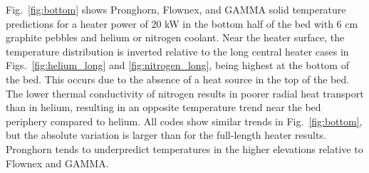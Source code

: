 Fig.\ \ref{fig:bottom} shows Pronghorn, Flownex, and GAMMA solid temperature predictions for a heater power of 20 \si{\kilo\watt} in the bottom half of the bed with 6 \si{\centi\meter} graphite pebbles and helium or nitrogen coolant. Near the heater surface, the temperature distribution is inverted relative to the long central heater cases in Figs.\ \ref{fig:helium_long} and \ref{fig:nitrogen_long}, being highest at the bottom of the bed. This occurs due to the absence of a heat source in the top of the bed. The lower thermal conductivity of nitrogen results in poorer radial heat transport than in helium, resulting in an opposite temperature trend near the bed periphery compared to helium. All codes show similar trends in Fig.\ \ref{fig:bottom}, but the absolute variation is larger than for the full-length heater results. Pronghorn tends to underpredict temperatures in the higher elevations relative to Flownex and GAMMA. 

